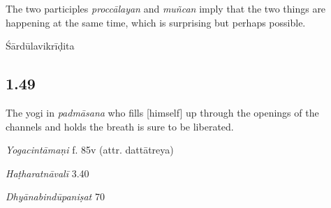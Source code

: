 \begin{ekdosis}
\begin{philcomm}[hp01_048]
The two participles \emph{proccālayan} and \emph{muñcan} imply that the two things are happening at the same time, which is surprising but perhaps possible.%

\end{philcomm}

\begin{metre}[hp01_048]
Śārdūlavikrīḍita 
\end{metre}

\subsection*{1.49}
\begin{translation}[hp01_049]
The yogi in \emph{padmāsana} who fills [himself] up through the openings of the channels and holds the breath is sure to be liberated.
\end{translation}


\begin{testimonia}[hp01_049]
\emph{Yogacintāmaṇi} f. 85v (attr. dattātreya)

\begin{versinnote}
\end{versinnote}

\emph{Haṭharatnāvalī} 3.40

\begin{versinnote}
\end{versinnote}

\emph{Dhyānabindūpaniṣat} 70

\begin{versinnote}
\end{versinnote}


\end{testimonia}
\end{ekdosis}
